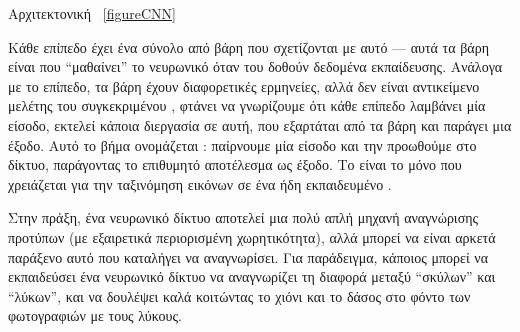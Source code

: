 Αρχιτεκτονική ~\ref{figureCNN} 

Κάθε επίπεδο έχει ένα σύνολο από βάρη που σχετίζονται με αυτό — αυτά τα βάρη είναι που “μαθαίνει” το νευρωνικό όταν του δοθούν δεδομένα εκπαίδευσης. Ανάλογα με το επίπεδο, τα βάρη έχουν διαφορετικές ερμηνείες, αλλά δεν είναι αντικείμενο μελέτης του συγκεκριμένου , φτάνει να γνωρίζουμε ότι κάθε επίπεδο λαμβάνει μία είσοδο, εκτελεί κάποια διεργασία σε αυτή, που εξαρτάται από τα βάρη και παράγει μια έξοδο. Αυτό το βήμα ονομάζεται : παίρνουμε μία είσοδο και την προωθούμε στο δίκτυο, παράγοντας το επιθυμητό αποτέλεσμα ως έξοδο. Το  είναι το μόνο που χρειάζεται για την ταξινόμηση εικόνων σε ένα ήδη εκπαιδευμένο .
    

Στην πράξη, ένα νευρωνικό δίκτυο αποτελεί μια πολύ απλή μηχανή αναγνώρισης προτύπων (με εξαιρετικά περιορισμένη χωρητικότητα), αλλά μπορεί να είναι αρκετά παράξενο αυτό που καταλήγει να αναγνωρίσει. Για παράδειγμα, κάποιος μπορεί να εκπαιδεύσει ένα νευρωνικό δίκτυο να αναγνωρίζει τη διαφορά μεταξύ “σκύλων” και “λύκων”, και να δουλέψει καλά κοιτώντας το χιόνι και το δάσος στο φόντο των φωτογραφιών με τους λύκους.

